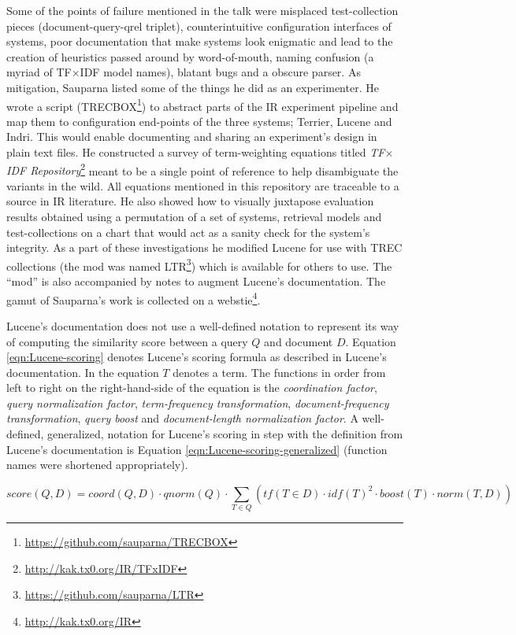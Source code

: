 Some of the points of failure mentioned in the talk were misplaced
test-collection pieces (document-query-qrel triplet), counterintuitive
configuration interfaces of systems, poor documentation that make
systems look enigmatic and lead to the creation of heuristics passed
around by word-of-mouth, naming confusion (a myriad of TF$\times$IDF
model names), blatant bugs and a obscure parser. As mitigation,
Sauparna listed some of the things he did as an experimenter. He wrote
a script (TRECBOX\footnote{\url{https://github.com/sauparna/TRECBOX}})
to abstract parts of the IR experiment pipeline and map them to
configuration end-points of the three systems; Terrier, Lucene and
Indri. This would enable documenting and sharing an experiment's
design in plain text files. He constructed a survey of term-weighting
equations titled \emph{TF$\times$IDF
  Repository}\footnote{\url{http://kak.tx0.org/IR/TFxIDF}} meant to be
a single point of reference to help disambiguate the variants in the
wild. All equations mentioned in this repository are traceable to a
source in IR literature. He also showed how to visually juxtapose
evaluation results obtained using a permutation of a set of systems,
retrieval models and test-collections on a chart that would act as a
sanity check for the system's integrity. As a part of these
investigations he modified Lucene for use with TREC collections (the
mod was named LTR\footnote{\url{https://github.com/sauparna/LTR}})
which is available for others to use. The ``mod'' is also accompanied
by notes to augment Lucene's documentation. The gamut of Sauparna's
work is collected on a webstie\footnote{\url{http://kak.tx0.org/IR}}.

Lucene's documentation does not use a well-defined notation to
represent its way of computing the similarity score between a query
$Q$ and document $D$. Equation \eqref{eqn:Lucene-scoring} denotes
Lucene's scoring formula as described in Lucene's documentation. In
the equation $T$ denotes a term. The functions in order from left to
right on the right-hand-side of the equation is the \emph{coordination
  factor}, \emph{query normalization factor}, \emph{term-frequency
  transformation}, \emph{document-frequency transformation},
\emph{query boost} and \emph{document-length normalization factor}. A
well-defined, generalized, notation for Lucene's scoring in step with
the definition from Lucene's documentation is Equation
\eqref{eqn:Lucene-scoring-generalized} (function names were shortened
appropriately).

\begin{equation}
  score(Q,D) = coord(Q,D) \cdot qnorm(Q) \cdot \displaystyle\sum_{T \in Q} (tf(T \in D) \cdot idf(T)^2 \cdot boost(T) \cdot norm(T,D))
  \label{eqn:Lucene-scoring}
\end{equation}

